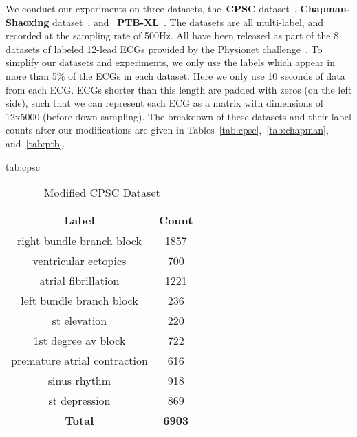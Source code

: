 \documentclass[pmlr,twocolumn]{jmlr}%
\begin{document}
We conduct our experiments on three datasets, the~\textbf{CPSC} dataset~\cite{liu2018open}, \textbf{Chapman-Shaoxing} dataset~\cite{zheng202012}, and ~\textbf{PTB-XL}~\cite{wagner2020ptb}. The datasets are all multi-label, and recorded at the sampling rate of 500Hz. All have been released as part of the 8 datasets of labeled 12-lead ECGs provided by the Physionet challenge~\cite{reyna2021will,reyna4issues}.
To simplify our datasets and experiments, we only use the labels which appear in more than 5\% of the ECGs in each dataset. Here we only use 10 seconds of data from each ECG. ECGs shorter than this length are padded with zeros (on the left side), such that we can represent each ECG as a matrix with dimensions of 12x5000 (before down-sampling).
The breakdown of these datasets and their label counts after our modifications are given in Tables~\ref{tab:cpsc},~\ref{tab:chapman}, and~\ref{tab:ptb}.
\begin{table}[tbp]
\floatconts
  {tab:cpsc}%
  {\caption{Modified CPSC Dataset}}%
  {
\begin{tabular}{|c|c|}
 \hline
Label & Count \\
 \hline
right bundle branch block    &  1857 \\
ventricular ectopics         &   700 \\
atrial fibrillation          &  1221 \\
left bundle branch block     &   236 \\
st elevation                 &   220 \\
1st degree av block          &   722 \\
premature atrial contraction &   616 \\
sinus rhythm                 &   918 \\
st depression                &   869 \\
 \hline
\textbf{Total} & \textbf{6903}\\
\hline
\end{tabular}
  }
\end{table}
\end{document}
